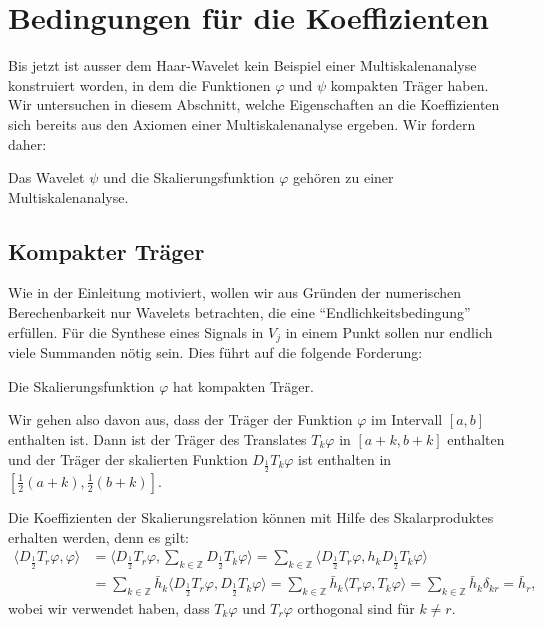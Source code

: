 %
%
%
\section{Bedingungen für die Koeffizienten\label{section:bedingungen}}
Bis jetzt ist ausser dem Haar-Wavelet kein Beispiel einer
Multiskalenanalyse konstruiert worden, in dem die Funktionen 
$\varphi$ und $\psi$ kompakten Träger haben.
Wir untersuchen in diesem Abschnitt, welche Eigenschaften an die 
Koeffizienten sich bereits aus den Axiomen einer Multiskalenanalyse
ergeben.
Wir fordern daher:

\begin{forderung}
\label{forderung:msa}
Das Wavelet $\psi$ und die Skalierungsfunktion $\varphi$ gehören zu
einer Multiskalenanalyse.
\end{forderung}

\subsection{Kompakter Träger}
%
%
Wie in der Einleitung motiviert, wollen wir aus Gründen der numerischen
Berechenbarkeit nur Wavelets betrachten, die eine ``Endlichkeitsbedingung''
erfüllen.
Für die Synthese eines Signals in $V_j$ in einem Punkt sollen nur endlich
viele Summanden nötig sein.
Dies führt auf die folgende Forderung:

\begin{forderung}
\label{forderung:kompakt}
Die Skalierungsfunktion $\varphi$ hat kompakten Träger.
\end{forderung}

Wir gehen also davon aus, dass der Träger der Funktion $\varphi$ im Intervall
$[a,b]$ enthalten ist.
Dann ist der Träger des Translates $T_k\varphi$ in $[a+k,b+k]$ enthalten
und der Träger der skalierten Funktion $D_{\frac12}T_k\varphi$ ist
enthalten in $[\frac12(a+k),\frac12(b+k)]$.

Die Koeffizienten der Skalierungsrelation können mit Hilfe des
Skalarproduktes erhalten werden, denn es gilt:
\begin{align*}
\langle D_{\frac12}T_r\varphi, \varphi\rangle
&=
\biggl\langle
D_{\frac12}T_r\varphi, \sum_{k\in\mathbb Z} D_{\frac12}T_k\varphi
\biggr\rangle
=
\sum_{k\in\mathbb Z}
\langle
D_{\frac12}T_r\varphi,
h_kD_{\frac12}T_k\varphi
\rangle
\\
&=
\sum_{k\in\mathbb Z}
\bar{h}_k
\langle
D_{\frac12}T_r\varphi,
D_{\frac12}T_k\varphi
\rangle
=
\sum_{k\in\mathbb Z}
\bar{h}_k
\langle
T_r\varphi,
T_k\varphi
\rangle
=
\sum_{k\in\mathbb Z}
\bar{h}_k
\delta_{kr}
=
\bar{h}_r,
\end{align*}
wobei wir verwendet haben, dass $T_k\varphi$ und $T_r\varphi$ orthogonal
sind für $k\ne r$.


